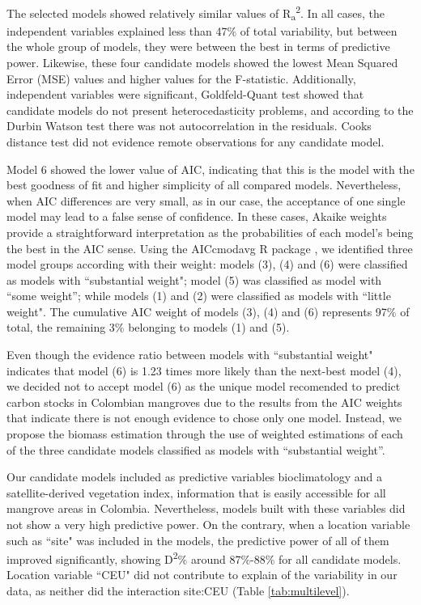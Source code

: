 \documentclass[review, authoryear]{elsarticle}   	%
\begin{document}
The selected models showed relatively similar values of R\textsubscript{a}\textsuperscript{2}. In all cases, the independent variables explained less than 47\% of total variability, but between the whole group of models,  they were between the best in terms of predictive power. Likewise, these four candidate models showed the lowest Mean Squared Error (MSE) values and higher values for the F-statistic. Additionally, independent variables were significant, Goldfeld-Quant test showed that candidate models do not present heterocedasticity problems, and according to the Durbin Watson test there was not autocorrelation in the residuals. Cooks distance test did not evidence remote observations for any candidate model. 

Model 6 showed the lower value of AIC, indicating that this is the model with the best goodness of fit and higher simplicity of all compared models. Nevertheless, when AIC differences are very small, as in our case, the acceptance of one single model may lead to a false sense of confidence. In these cases, Akaike weights provide a straightforward interpretation as the probabilities of each model's being the best in the AIC sense. Using the AICcmodavg R package \citep{Mazerolle:2015aa}, we identified three model groups according with their weight: models (3), (4) and (6) were classified as models with ``substantial weight"; model (5) was classified as model with ``some weight''; while models (1) and (2) were classified  as models with ``little weight". The cumulative AIC weight of models (3), (4) and (6) represents 97\% of total, the remaining 3\% belonging to models (1) and (5). 

Even though the evidence ratio between models with ``substantial weight" indicates that model (6) is 1.23 times more likely than  the next-best model (4), we decided not to accept model (6) as the unique model recomended to predict carbon stocks in Colombian mangroves due to  the results from the AIC weights that indicate there is not enough evidence to chose only one model. Instead, we propose the biomass estimation through the use of weighted estimations of each of the three candidate models classified as models with ``substantial weight''.

Our candidate models included as predictive variables bioclimatology and a satellite-derived vegetation index, information that is easily accessible for all mangrove areas in Colombia. Nevertheless, models built with these variables did not show a very high predictive power. On the contrary, when a location variable such as ``site" was included in the models, the predictive power of all of them improved significantly, showing D\textsuperscript{2}\% around 87\%-88\% for all candidate models. Location variable ``CEU" did not contribute to explain of the variability in our data, as neither did the interaction site:CEU (Table \ref{tab:multilevel}).
\end{document}
